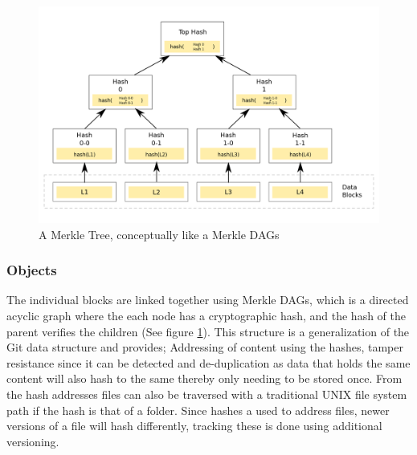\begin{figure}[ht]
    \centering
    \includegraphics[width=\textwidth]{gfx/merkle_tree}
    \caption[A Merkle Tree]{A Merkle Tree, conceptually like a Merkle \acsp{DAG}}
    \label{fig:merkle_tree}
\end{figure}

\subsubsection{Objects}
\label{sec:ipfs-objects}
The individual blocks are linked together using Merkle \acp{DAG}, which is a directed acyclic graph where the each node has a cryptographic hash, and the hash of the parent verifies the children (See figure \ref{fig:merkle_tree}). This structure is a generalization of the Git data structure and provides; Addressing of content using the hashes, tamper resistance since it can be detected and de-duplication as data that holds the same content will also hash to the same thereby only needing to be stored once. From the hash addresses files can also be traversed with a traditional UNIX file system path if the hash is that of a folder.
Since hashes a used to address files, newer versions of a file will hash differently, tracking these is done using additional versioning.

